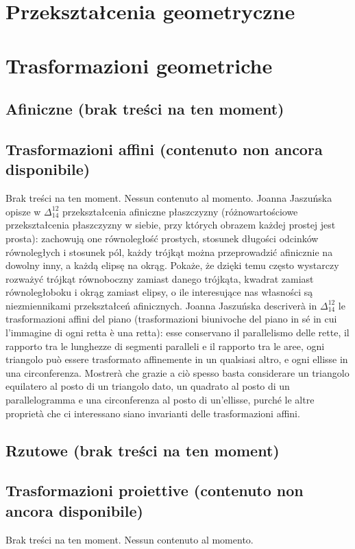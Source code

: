 %

\chapter{Przekształcenia geometryczne} %
\chapter{Trasformazioni geometriche} %





\section{Afiniczne (brak treści na ten moment)} %
\section{Trasformazioni affini (contenuto non ancora disponibile)} %
Brak treści na ten moment. %
Nessun contenuto al momento. %
Joanna Jaszuńska opisze w $\Delta_{14}^{12}$ przekształcenia afiniczne płaszczyzny (różnowartościowe przekształcenia płaszczyzny w siebie, przy których obrazem każdej prostej jest prosta): zachowują one równoległość prostych, stosunek długości odcinków równoległych i stosunek pól, każdy trójkąt można przeprowadzić afinicznie na dowolny inny, a każdą elipsę na okrąg. %
Pokaże, że dzięki temu często wystarczy rozważyć trójkąt równoboczny zamiast danego trójkąta, kwadrat zamiast równoległoboku i okrąg zamiast elipsy, o ile interesujące nas własności są niezmiennikami przekształceń afinicznych. %
Joanna Jaszuńska descriverà in $\Delta_{14}^{12}$ le trasformazioni affini del piano (trasformazioni biunivoche del piano in sé in cui l'immagine di ogni retta è una retta): esse conservano il parallelismo delle rette, il rapporto tra le lunghezze di segmenti paralleli e il rapporto tra le aree, ogni triangolo può essere trasformato affinemente in un qualsiasi altro, e ogni ellisse in una circonferenza. %
Mostrerà che grazie a ciò spesso basta considerare un triangolo equilatero al posto di un triangolo dato, un quadrato al posto di un parallelogramma e una circonferenza al posto di un'ellisse, purché le altre proprietà che ci interessano siano invarianti delle trasformazioni affini. %

\section{Rzutowe (brak treści na ten moment)} %
\section{Trasformazioni proiettive (contenuto non ancora disponibile)} %
Brak treści na ten moment. %
Nessun contenuto al momento.  %

%